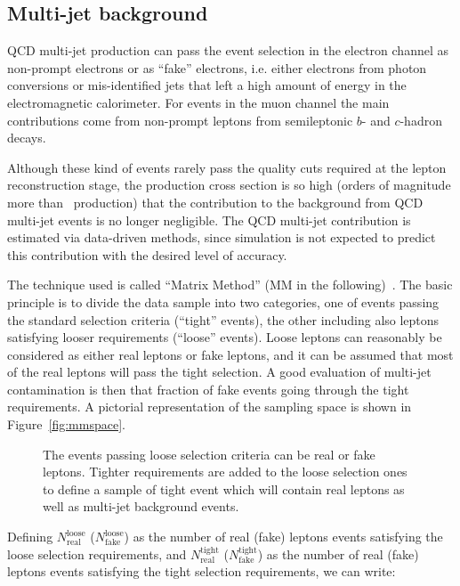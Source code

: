 \subsection{Multi-jet background}\label{sec:qcdbkg}

QCD multi-jet production can pass the event selection in the electron
channel as non-prompt electrons or as ``fake'' electrons, i.e.
either electrons from photon conversions or mis-identified jets
that left a high amount of energy in the electromagnetic calorimeter.
For events in the muon channel the main contributions come from
non-prompt leptons from semileptonic $b$- and $c$-hadron decays.

Although these kind of events rarely pass the quality cuts 
required at the lepton reconstruction stage, the production cross section
is so high (orders  of magnitude more than \ttbar\ production)
that the contribution to the background from QCD multi-jet events is
no longer negligible. The QCD multi-jet contribution
is estimated via data-driven 
methods, since simulation is not expected to predict this contribution
with the desired level of accuracy.

The technique used is called ``Matrix Method'' (MM in the following)~\cite{ttbar_3pb}.  
The basic principle is to divide the data sample into two categories, one
of events passing the standard selection criteria (``tight'' events), the
other including also leptons satisfying looser requirements (``loose'' events).
Loose leptons can reasonably  be considered as either real leptons or fake leptons,
and it can be assumed that most of the real leptons will pass the tight selection. 
A good evaluation of multi-jet contamination is then that fraction of fake events going
through the tight requirements. A pictorial representation of the sampling space 
is shown in Figure~\ref{fig:mmspace}.

\begin{figure}[htb]\begin{center}
	\caption{The events passing loose selection criteria can be real or fake leptons.
        Tighter requirements are added to the loose selection ones to define a sample of
        tight event which will contain real leptons as well as multi-jet background events.}
\end{center}\end{figure}

Defining $N^\mathrm{loose}_\mathrm{real}$ ($N^\mathrm{loose}_\mathrm{fake}$) as the number of
real (fake) leptons events satisfying the loose selection requirements, and
$N^\mathrm{tight}_\mathrm{real}$ ($N^\mathrm{tight}_\mathrm{fake}$) as the number of
real (fake) leptons events satisfying the tight selection requirements, we can write:

